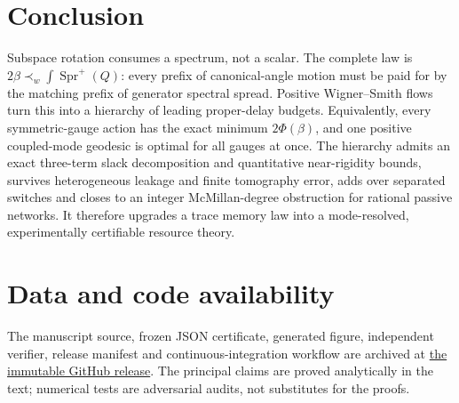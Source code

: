 \documentclass[11pt]{article}
\theoremstyle{definition}
\theoremstyle{remark}
\newcommand{\Spr}{\operatorname{Spr}^{+}}
\begin{document}
\section{Conclusion}

Subspace rotation consumes a spectrum, not a scalar.  The complete law is
$2\beta\prec_w\int\Spr(Q)$: every prefix of canonical-angle motion must be
paid for by the matching prefix of generator spectral spread.  Positive
Wigner--Smith flows turn this into a hierarchy of leading proper-delay
budgets.  Equivalently, every symmetric-gauge action has the exact minimum
$2\Phi(\beta)$, and one positive coupled-mode geodesic is optimal for all
gauges at once.  The hierarchy admits an exact three-term slack decomposition
and quantitative near-rigidity bounds, survives heterogeneous leakage and
finite tomography error, adds over separated switches and closes to an integer
McMillan-degree obstruction for rational passive networks.  It therefore
upgrades a trace memory law into a mode-resolved, experimentally certifiable
resource theory.

\section*{Data and code availability}

The manuscript source, frozen JSON certificate, generated figure, independent
verifier, release manifest and continuous-integration workflow are archived at
\href{https://github.com/lluiseriksson/finite-sample-spectral-certificates/releases/tag/v1.5-exact-finsler-speed-limits}{the immutable GitHub release}.  The principal claims are proved analytically
in the text; numerical tests are adversarial audits, not substitutes for the
proofs.



\end{document}

